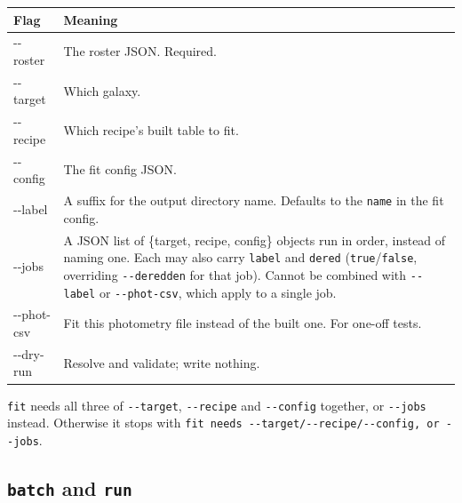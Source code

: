 \documentclass[11pt]{article}
\begin{document}
\begin{longtable}{>{\ttfamily}l p{9.4cm}}
\toprule
\textbf{\normalfont Flag} & \textbf{Meaning} \\
\midrule
\endhead
-{}-roster & The roster JSON. Required. \\
-{}-target & Which galaxy. \\
-{}-recipe & Which recipe's built table to fit. \\
-{}-config & The fit config JSON. \\
-{}-label & A suffix for the output directory name. Defaults to the
  \texttt{name} in the fit config. \\
-{}-jobs & A JSON list of \{target, recipe, config\} objects run in
  order, instead of naming one. Each may also carry \texttt{label} and
  \texttt{dered} (\texttt{true}/\texttt{false}, overriding
  \texttt{-{}-deredden} for that job). Cannot be combined with
  \texttt{-{}-label} or \texttt{-{}-phot-csv}, which apply to a single
  job. \\
-{}-phot-csv & Fit this photometry file instead of the built one. For
  one-off tests. \\
-{}-dry-run & Resolve and validate; write nothing. \\
\bottomrule
\end{longtable}

\noindent \texttt{fit} needs all three of \texttt{-{}-target},
\texttt{-{}-recipe} and \texttt{-{}-config} together, or
\texttt{-{}-jobs} instead. Otherwise it stops with \texttt{fit needs
-{}-target/-{}-recipe/-{}-config, or -{}-jobs}.

\subsection{\texttt{batch} and \texttt{run}}
\end{document}
